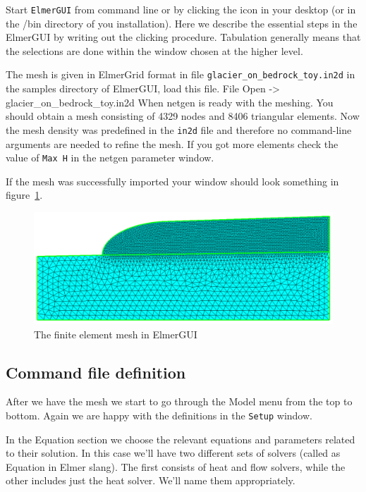 Start \texttt{ElmerGUI} from command line or by clicking the icon in your desktop (or in the /bin directory of you installation). 
Here we describe the essential steps in the ElmerGUI by writing out the clicking procedure. Tabulation generally means that the 
selections are done within the window chosen at the higher level. 

The mesh is given in ElmerGrid format in file \texttt{glacier\_on\_bedrock\_toy.in2d} in the samples directory of ElmerGUI, 
load this file.
\ttbegin
File 
  Open -> glacier\_on\_bedrock\_toy.in2d
\ttend
When netgen is ready with the meshing. You should obtain a mesh consisting of 4329 nodes and 8406
triangular elements. Now the mesh density was predefined in the \texttt{in2d} file and therefore no command-line
arguments are needed to refine the mesh. If you got more elements check the value of \texttt{Max H} in the netgen parameter window.

If the mesh was successfully imported your window should look something in figure~\ref{glacrock:mesh}.

\begin{figure}
\begin{center}
\includegraphics[width=120mm]{glacier_and_bedrock_toy_mesh}
\caption{The finite element mesh in ElmerGUI}\label{glacrock:mesh}
\end{center}
\end{figure}

\subsection*{Command file definition}

After we have the mesh we start to go through the Model menu from the top to bottom. 
Again we are happy with the definitions in the \texttt{Setup} window.

In the Equation section we choose the relevant equations and parameters related to their solution. 
In this case we'll have two different sets of solvers (called as Equation in Elmer slang). 
The first consists of heat and flow solvers, while the 
other includes just the heat solver. We'll name them appropriately. 

